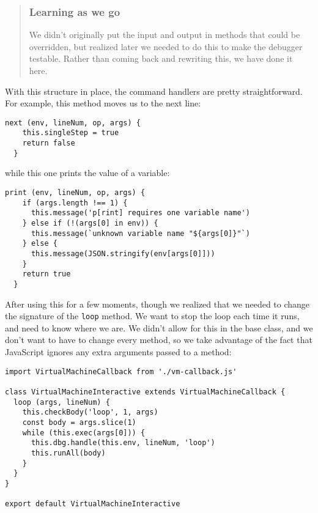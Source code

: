 \documentclass[krantzl]{krantz}
\newenvironment{callout}{\savenotes\begin{tBox}\begin{quotation}\toggletrue{inbox}\renewcommand{\thempfootnote}{\arabic{footnote}}}{\end{quotation}\vspace{\baselineskip}\end{tBox}\togglefalse{inbox}\spewnotes}
\begin{document}
\begin{callout}


\subsubsection*{Learning as we go}


We didn't originally put the input and output in methods that could be overridden,
but realized later we needed to do this to make the debugger testable.
Rather than coming back and rewriting this,
we have done it here.

\end{callout}


With this structure in place,
the command handlers are pretty straightforward.
For example,
this method moves us to the next line:


\begin{lstlisting}[frame=single,frameround=tttt]
  next (env, lineNum, op, args) {
    this.singleStep = true
    return false
  }
\end{lstlisting}



\noindent while this one prints the value of a variable:


\begin{lstlisting}[frame=single,frameround=tttt]
  print (env, lineNum, op, args) {
    if (args.length !== 1) {
      this.message('p[rint] requires one variable name')
    } else if (!(args[0] in env)) {
      this.message(`unknown variable name "${args[0]}"`)
    } else {
      this.message(JSON.stringify(env[args[0]]))
    }
    return true
  }
\end{lstlisting}



After using this for a few moments,
though
we realized that we needed to change the signature of the \texttt{loop} method.
We want to stop the loop each time it runs,
and need to know where we are.
We didn't allow for this in the base class,
and we don't want to have to change every method,
so we take advantage of the fact that JavaScript ignores any extra arguments passed to a method:


\begin{lstlisting}[frame=single,frameround=tttt]
import VirtualMachineCallback from './vm-callback.js'

class VirtualMachineInteractive extends VirtualMachineCallback {
  loop (args, lineNum) {
    this.checkBody('loop', 1, args)
    const body = args.slice(1)
    while (this.exec(args[0])) {
      this.dbg.handle(this.env, lineNum, 'loop')
      this.runAll(body)
    }
  }
}

export default VirtualMachineInteractive
\end{lstlisting}
\end{document}
